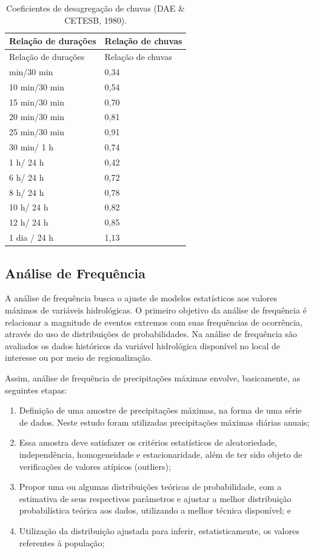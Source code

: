 \documentclass[
]{agujournal2019}
\begin{document}
\begin{longtable}[]{@{}ll@{}}
\caption{Coeficientes de desagregação de chuvas (DAE \& CETESB,
1980).}\label{tbl-Tab3}\tabularnewline
\toprule\noalign{}
Relação de durações & Relação de chuvas \\
\midrule\noalign{}
\endfirsthead
\toprule\noalign{}
Relação de durações & Relação de chuvas \\
\midrule\noalign{}
\endhead
\bottomrule\noalign{}
\endlastfoot
5 min/30 min & 0,34 \\
10 min/30 min & 0,54 \\
15 min/30 min & 0,70 \\
20 min/30 min & 0,81 \\
25 min/30 min & 0,91 \\
30 min/ 1 h & 0,74 \\
1 h/ 24 h & 0,42 \\
6 h/ 24 h & 0,72 \\
8 h/ 24 h & 0,78 \\
10 h/ 24 h & 0,82 \\
12 h/ 24 h & 0,85 \\
1 dia / 24 h & 1,13 \\
\end{longtable}

\subsection{Análise de Frequência}\label{anuxe1lise-de-frequuxeancia}

A análise de frequência busca o ajuste de modelos estatísticos aos
valores máximos de variáveis hidrológicas. O primeiro objetivo da
análise de frequência é relacionar a magnitude de eventos extremos com
suas frequências de ocorrência, através do uso de distribuições de
probabilidades. Na análise de frequência são avaliados os dados
históricos da variável hidrológica disponível no local de interesse ou
por meio de regionalização.

Assim, análise de frequência de precipitações máximas envolve,
basicamente, as seguintes etapas:

\begin{enumerate}
\def\labelenumi{\alph{enumi}.}
\item
  Definição de uma amostre de precipitações máximas, na forma de uma
  série de dados. Neste estudo foram utilizadas precipitações máximas
  diárias anuais;
\item
  Essa amostra deve satisfazer os critérios estatísticos de
  aleatoriedade, independência, homogeneidade e estacionaridade, além de
  ter sido objeto de verificações de valores atípicos (outliers);
\item
  Propor uma ou algumas distribuições teóricas de probabilidade, com a
  estimativa de seus respectivos parâmetros e ajustar a melhor
  distribuição probabilística teórica aos dados, utilizando a melhor
  técnica disponível; e
\item
  Utilização da distribuição ajustada para inferir, estatisticamente, os
  valores referentes à população;
\end{enumerate}
\end{document}
